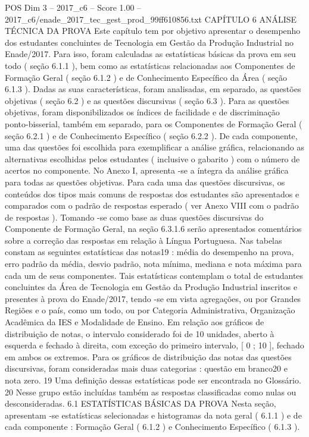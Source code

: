 \begin{textsample}{POS Dim 3 – 2017\_c6 – Score 1.00 – 2017\_c6/enade\_2017\_tec\_gest\_prod\_99ff610856.txt}  \label{ex:f3_pos_196}
CAPÍTULO 6 ANÁLISE TÉCNICA DA PROVA Este capítulo tem por objetivo apresentar o desempenho dos estudantes concluintes de Tecnologia em Gestão da Produção Industrial no Enade/2017.
Para isso, foram calculadas as estatísticas básicas da prova em seu todo ( seção 6.1.1 ), bem como as estatísticas relacionadas aos Componentes de Formação Geral ( seção 6.1.2 ) e de Conhecimento Específico da Área ( seção 6.1.3 ).
Dadas as suas características, foram analisadas, em separado, as questões objetivas ( seção 6.2 ) e as questões discursivas ( seção 6.3 ).
Para as questões objetivas, foram disponibilizados os índices de facilidade e de discriminação ponto-bisserial, também em separado, para os Componentes de Formação Geral ( seção 6.2.1 ) e de Conhecimento Específico ( seção 6.2.2 ).
De cada componente, uma das questões foi escolhida para exemplificar a análise gráfica, relacionando as alternativas escolhidas pelos estudantes ( inclusive o gabarito ) com o número de acertos no componente.
No Anexo I, apresenta -se a íntegra da análise gráfica para todas as questões objetivas.
Para cada uma das questões discursivas, os conteúdos dos tipos mais comuns de respostas dos estudantes são apresentados e comparados com o padrão de respostas esperado ( ver Anexo VIII com o padrão de respostas ).
Tomando -se como base as duas questões discursivas do Componente de Formação Geral, na seção 6.3.1.6 serão apresentados comentários sobre a correção das respostas em relação à Língua Portuguesa.
Nas tabelas constam as seguintes estatísticas das notas19 : média do desempenho na prova, erro padrão da média, desvio padrão, nota mínima, mediana e nota máxima para cada um de seus componentes.
Tais estatísticas contemplam o total de estudantes concluintes da Área de Tecnologia em Gestão da Produção Industrial inscritos e presentes à prova do Enade/2017, tendo -se em vista agregações, ou por Grandes Regiões e o país, como um todo, ou por Categoria Administrativa, Organização Acadêmica da IES e Modalidade de Ensino.
Em relação aos gráficos de distribuição de notas, o intervalo considerado foi de 10 unidades, aberto à esquerda e fechado à direita, com exceção do primeiro intervalo, [ 0 ; 10 ], fechado em ambos os extremos.
Para os gráficos de distribuição das notas das questões discursivas, foram consideradas mais duas categorias : questão em branco20 e nota zero. 19 Uma definição dessas estatísticas pode ser encontrada no Glossário. 20 Nesse grupo estão incluídas também as respostas classificadas como nulas ou desconsideradas. 6.1 ESTATÍSTICAS BÁSICAS DA PROVA Nesta seção, apresentam -se estatísticas selecionadas e histogramas da nota geral ( 6.1.1 ) e de cada componente : Formação Geral ( 6.1.2 ) e Conhecimento Específico ( 6.1.3 ).

\end{textsample}
